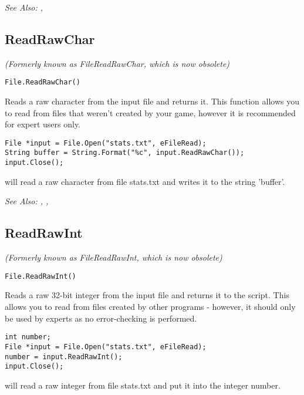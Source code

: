\it{See Also:} , 


\subsection{ReadRawChar}\label{File.ReadRawChar}%

\it{(Formerly known as FileReadRawChar, which is now obsolete)}

\begin{verbatim}
File.ReadRawChar()
\end{verbatim}
Reads a raw character from the input file and returns it. This function
allows you to read from files that weren't created by your game,
however it is recommended for expert users only.

\begin{verbatim}
File *input = File.Open("stats.txt", eFileRead);
String buffer = String.Format("%c", input.ReadRawChar());
input.Close();
\end{verbatim}
will read a raw character from file stats.txt and writes it to the string 'buffer'.

\it{See Also:} , ,


\subsection{ReadRawInt}\label{File.ReadRawInt}%

\it{(Formerly known as FileReadRawInt, which is now obsolete)}

\begin{verbatim}
File.ReadRawInt()
\end{verbatim}
Reads a raw 32-bit integer from the input file and returns it to the script.
This allows you to read from files created by other programs - however, it
should only be used by experts as no error-checking is performed.

\begin{verbatim}
int number;
File *input = File.Open("stats.txt", eFileRead);
number = input.ReadRawInt();
input.Close();
\end{verbatim}
will read a raw integer from file stats.txt and put it into the integer number.

